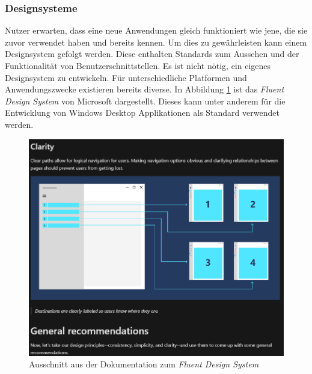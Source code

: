 \subsubsection{Designsysteme}
Nutzer erwarten, dass eine neue Anwendungen gleich funktioniert wie jene, die sie zuvor verwendet haben und bereits kennen.
Um dies zu gewährleisten kann einem Designsystem gefolgt werden.
Diese enthalten Standards zum Aussehen und der Funktionalität von Benutzerschnittstellen.
Es ist nicht nötig, ein eigenes Designsystem zu entwickeln.
Für unterschiedliche Platformen und Anwendungszwecke existieren bereits diverse.
In Abbildung \ref{fig:fluent} ist das \textit{Fluent Design System} von Microsoft dargestellt.
Dieses kann unter anderem für die Entwicklung von Windows Desktop Applikationen als Standard verwendet werden.
\begin{figure}[H]
   \centering
   \includegraphics[width=1.0\textwidth]{gfx/design_system_ms.png}
   \caption{
      Ausschnitt aus der Dokumentation zum \textit{Fluent Design System}
   }
   \label{fig:fluent}
\end{figure}